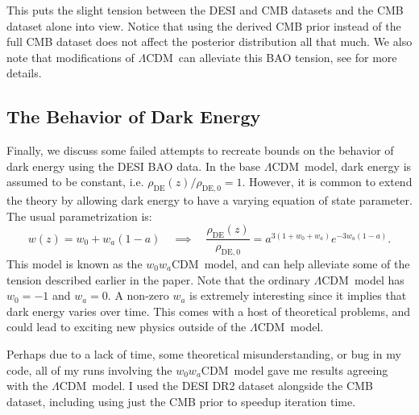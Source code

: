 \documentclass{lkx_paper}
\newcommand{\DE}{{\mathrm{DE}}}
\newcommand{\LCDM}{$\Lambda\mathrm{CDM}$~}
\newcommand{\wwCDM}{{$w_0 w_a\mathrm{CDM}$~}}
\begin{document}
This puts the slight tension between the DESI and CMB datasets and the CMB dataset alone into view. Notice that using the derived CMB prior instead of the full CMB dataset does not affect the posterior distribution all that much. We also note that modifications of \LCDM can alleviate this BAO tension, see \cite{desicollaboration2025desidr2resultsii} for more details.

\subsection*{The Behavior of Dark Energy}

Finally, we discuss some failed attempts to recreate bounds on the behavior of dark energy using the DESI BAO data.
In the base \LCDM model, dark energy is assumed to be constant, i.e. $\rho_\DE(z)/\rho_{\DE,0}=1$. However, it is common to extend the theory by allowing dark energy to have a varying equation of state parameter. The usual parametrization is:
\begin{equation}
w(z)=w_0+w_a(1-a)\quad\implies\quad
  \frac{\rho_\DE(z)}{\rho_{\DE,0}} = a^{3(1+w_0+w_a)}e^{-3w_a(1-a)}.
\end{equation}
This model is known as the \wwCDM model, and can help alleviate some of the tension described earlier in the paper. Note that the ordinary \LCDM model has $w_0=-1$ and $w_a=0$. A non-zero $w_a$ is extremely interesting since it implies that dark energy varies over time. This comes with a host of theoretical problems, and could lead to exciting new physics outside of the \LCDM model.

Perhaps due to a lack of time, some theoretical misunderstanding, or bug in my code, all of my runs involving the \wwCDM model gave me results agreeing with the \LCDM model. I used the DESI DR2 dataset alongside the CMB dataset, including using just the CMB prior to speedup iteration time.
\end{document}
